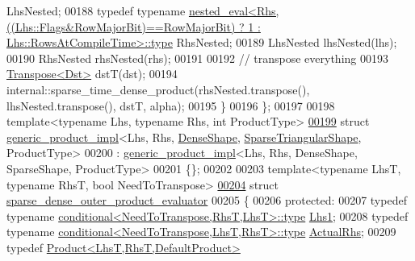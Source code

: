 \begin{DoxyCode}
       LhsNested;
00188     \textcolor{keyword}{typedef} \textcolor{keyword}{typename} 
      \hyperlink{class_eigen_1_1internal_1_1_tensor_lazy_evaluator_writable}{nested\_eval<Rhs,((Lhs::Flags&RowMajorBit)==RowMajorBit) ? 1 : Lhs::RowsAtCompileTime>::type}
       RhsNested;
00189     LhsNested lhsNested(lhs);
00190     RhsNested rhsNested(rhs);
00191     
00192     \textcolor{comment}{// transpose everything}
00193     \hyperlink{group___core___module_class_eigen_1_1_transpose}{Transpose<Dst>} dstT(dst);
00194     internal::sparse\_time\_dense\_product(rhsNested.transpose(), lhsNested.transpose(), dstT, alpha);
00195   \}
00196 \};
00197 
00198 \textcolor{keyword}{template}<\textcolor{keyword}{typename} Lhs, \textcolor{keyword}{typename} Rhs, \textcolor{keywordtype}{int} ProductType>
\hyperlink{struct_eigen_1_1internal_1_1generic__product__impl_3_01_lhs_00_01_rhs_00_01_dense_shape_00_01_sp47812b7c46d160bb7782b8c6e085fdfe}{00199} \textcolor{keyword}{struct }\hyperlink{struct_eigen_1_1internal_1_1generic__product__impl}{generic\_product\_impl}<Lhs, Rhs, \hyperlink{struct_eigen_1_1_dense_shape}{DenseShape}, 
      \hyperlink{struct_eigen_1_1internal_1_1_sparse_triangular_shape}{SparseTriangularShape}, ProductType>
00200   : \hyperlink{struct_eigen_1_1internal_1_1generic__product__impl}{generic\_product\_impl}<Lhs, Rhs, DenseShape, SparseShape, ProductType>
00201 \{\};
00202 
00203 \textcolor{keyword}{template}<\textcolor{keyword}{typename} LhsT, \textcolor{keyword}{typename} RhsT, \textcolor{keywordtype}{bool} NeedToTranspose>
\hyperlink{struct_eigen_1_1internal_1_1sparse__dense__outer__product__evaluator}{00204} \textcolor{keyword}{struct }\hyperlink{struct_eigen_1_1internal_1_1sparse__dense__outer__product__evaluator}{sparse\_dense\_outer\_product\_evaluator}
00205 \{
00206 \textcolor{keyword}{protected}:
00207   \textcolor{keyword}{typedef} \textcolor{keyword}{typename} \hyperlink{class_eigen_1_1internal_1_1_tensor_lazy_evaluator_writable}{conditional<NeedToTranspose,RhsT,LhsT>::type}
       \hyperlink{class_eigen_1_1internal_1_1_tensor_lazy_evaluator_writable}{Lhs1};
00208   \textcolor{keyword}{typedef} \textcolor{keyword}{typename} \hyperlink{class_eigen_1_1internal_1_1_tensor_lazy_evaluator_writable}{conditional<NeedToTranspose,LhsT,RhsT>::type}
       \hyperlink{class_eigen_1_1internal_1_1_tensor_lazy_evaluator_writable}{ActualRhs};
00209   \textcolor{keyword}{typedef} \hyperlink{group___core___module_class_eigen_1_1_product}{Product<LhsT,RhsT,DefaultProduct>} 

\end{DoxyCode}
